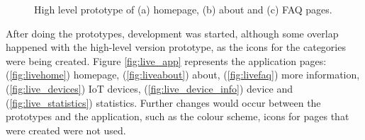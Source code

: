 \begin{figure}[H]
\begin{subfigure}{0.33\textwidth}
        \caption{}
        \label{fig:highfaq}
    \end{subfigure}%
    \caption{High level prototype of (a) homepage, (b) about and (c) FAQ pages.}
    \label{fig:highlevelprototype}
\end{figure}

After doing the prototypes, development was started, although some overlap
happened with the high-level version prototype, as the icons for the categories
were being created. Figure \ref{fig:live_app} represents the application pages:
(\ref{fig:livehome}) homepage, (\ref{fig:liveabout}) about, (\ref{fig:livefaq}) more
information, (\ref{fig:live_devices}) IoT devices, (\ref{fig:live_device_info}) device
and (\ref{fig:live_statistics}) statistics.
Further changes would occur between the prototypes and
the application, such as the colour scheme, icons for pages that were created
were not used.

